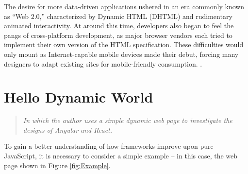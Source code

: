 \documentclass[12pt,letterpaper]{article}
\begin{document}
The desire for more data-driven applications ushered in an era commonly known as ``Web 2.0,'' characterized by Dynamic HTML (DHTML) and rudimentary animated interactivity. At around this time, developers also began to feel the pangs of cross-platform development, as major browser vendors each tried to implement their own version of the HTML specification. These difficulties would only mount as Internet-capable mobile devices made their debut, forcing many designers to adapt existing sites for mobile-friendly consumption. \cite{Schlensker:2014}.


















\section{Hello Dynamic World}
\vspace{-12pt}

\begin{quote}
	\singlespacing
	\emph{In which the author uses a simple dynamic web page to investigate the designs of Angular and React.}
\end{quote}

To gain a better understanding of how frameworks improve upon pure JavaScript, it is necessary to consider a simple example -- in this case, the web page shown in Figure \ref{fig:Example}.
\end{document}

